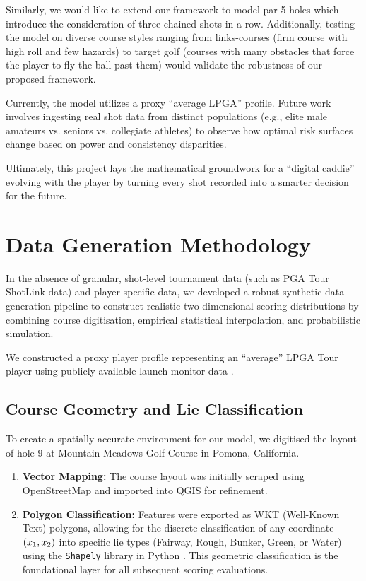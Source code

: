 \documentclass[11pt, letterpaper]{article}
\begin{document}
Similarly, we would like to extend our framework to model par 5 holes which introduce the consideration of three chained shots in a row. Additionally, testing the model on diverse course styles ranging from links-courses (firm course with high roll and few hazards) to target golf (courses with many obstacles that force the player to fly the ball past them) would validate the robustness of our proposed framework.

Currently, the model utilizes a proxy ``average LPGA'' profile. Future work involves ingesting real shot data from distinct populations (e.g., elite male amateurs vs. seniors vs. collegiate athletes) to observe how optimal risk surfaces change based on power and consistency disparities.

Ultimately, this project lays the mathematical groundwork for a ``digital caddie'' evolving with the player by turning every shot recorded into a smarter decision for the future.

\appendix
\section{Data Generation Methodology}
\label{sec:Appendix}
In the absence of granular, shot-level tournament data (such as PGA Tour ShotLink data) and player-specific data, we developed a robust synthetic data generation pipeline to construct realistic two-dimensional scoring distributions by combining course digitisation, empirical statistical interpolation, and probabilistic simulation.

We constructed a proxy player profile representing an ``average'' LPGA Tour player using publicly available launch monitor data \parencite{trackman2024averages}.

\subsection{Course Geometry and Lie Classification}
\label{app: course-representation}

To create a spatially accurate environment for our model, we digitised the layout of hole 9 at Mountain Meadows Golf Course in Pomona, California.
\begin{enumerate}
    \item \textbf{Vector Mapping:} The course layout was initially scraped using OpenStreetMap \parencite{openstreetmap} and imported into QGIS \parencite{qgis} for refinement.
    \item \textbf{Polygon Classification:} Features were exported as WKT (Well-Known Text) polygons, allowing for the discrete classification of any coordinate $(x_1, x_2)$ into specific lie types (Fairway, Rough, Bunker, Green, or Water) using the \texttt{Shapely} library in Python \parencite{shapely}. This geometric classification is the foundational layer for all subsequent scoring evaluations.
\end{enumerate}
\end{document}

